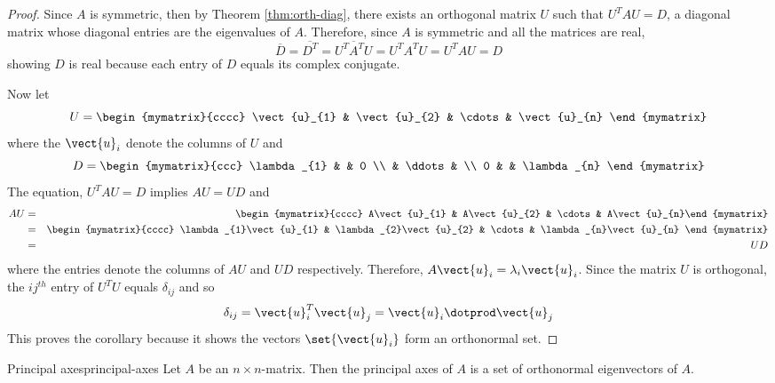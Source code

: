 \begin{proof}
Since $A$ is symmetric, then by Theorem \ref{thm:orth-diag},
there exists an orthogonal matrix $U$ such that $U^{T}AU=D$, a diagonal
matrix whose diagonal entries are the eigenvalues of $A$. Therefore, since $
A $ is symmetric and all the matrices are real, 
\begin{equation*}
\overline{D}=\overline{D^{T}}=\overline{U^{T}A^{T}U}=U^{T}A^{T}U=U^{T}AU=D
\end{equation*}
showing $D$ is real because each entry of $D$ equals its complex conjugate.

Now let 
\begin{equation*}
U=\begin{mymatrix}{cccc}
\vect{u}_{1} & \vect{u}_{2} & \cdots & \vect{u}_{n}
\end{mymatrix}
\end{equation*}
where the $\vect{u}_{i}$ denote the columns of $U$ and 
\begin{equation*}
D=\begin{mymatrix}{ccc}
\lambda _{1} &  & 0 \\ 
& \ddots &  \\ 
0 &  & \lambda _{n}
\end{mymatrix}
\end{equation*}
The equation, $U^{T}AU=D$ implies $AU = UD$ and 
\begin{eqnarray*}
AU &=&\begin{mymatrix}{cccc}
A\vect{u}_{1} & A\vect{u}_{2} & \cdots & A\vect{u}_{n}%
\end{mymatrix} \\
&=&\begin{mymatrix}{cccc}
\lambda _{1}\vect{u}_{1} & \lambda _{2}\vect{u}_{2} & \cdots & \lambda
_{n}\vect{u}_{n}
\end{mymatrix} \\
&=& UD
\end{eqnarray*}
where the entries denote the columns of $AU$ and $UD$ respectively.
Therefore, $A\vect{u}_{i}=\lambda _{i}\vect{u}_{i}$.  Since the matrix $U$
is orthogonal, the $ij^{th}$ entry of $U^{T}U$ equals $\delta _{ij}$ and so 
\begin{equation*}
\delta _{ij}=\vect{u}_{i}^{T}\vect{u}_{j}=\vect{u}_{i}\dotprod \vect{u}
_{j}
\end{equation*}
This proves the corollary because it shows the vectors $\set{\vect{u}
_{i}} $ form an orthonormal set.
\end{proof}

\begin{definition}{Principal axes}{principal-axes}
Let $A$ be an $n \times n$-matrix. Then the principal axes of $A$ is a set of orthonormal eigenvectors of $A$.
\end{definition}

